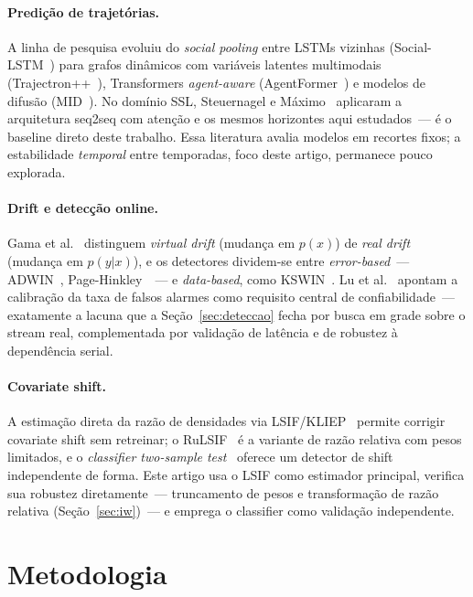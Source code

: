 \documentclass[runningheads]{llncs}
\begin{document}
\paragraph{Predi\c{c}\~ao de trajet\'orias.}
A linha de pesquisa evoluiu do \textit{social pooling} entre LSTMs vizinhas (Social-LSTM~\cite{alahi2016}) para grafos din\^amicos com vari\'aveis latentes multimodais (Trajectron++~\cite{salzmann2020}), Transformers \textit{agent-aware} (AgentFormer~\cite{yuan2021}) e modelos de difus\~ao (MID~\cite{gu2022}). No dom\'inio SSL, Steuernagel e M\'aximo~\cite{seq2seq} aplicaram a arquitetura seq2seq com aten\c{c}\~ao e os mesmos horizontes aqui estudados~--- \'e o baseline direto deste trabalho. Essa literatura avalia modelos em recortes fixos; a estabilidade \emph{temporal} entre temporadas, foco deste artigo, permanece pouco explorada.

\paragraph{Drift e detec\c{c}\~ao online.}
Gama et al.~\cite{gama2014} distinguem \textit{virtual drift} (mudan\c{c}a em $p(x)$) de \textit{real drift} (mudan\c{c}a em $p(y|x)$), e os detectores dividem-se entre \textit{error-based}~--- ADWIN~\cite{adwin}, Page-Hinkley~\cite{page_hinkley}~--- e \textit{data-based}, como KSWIN~\cite{kswin}. Lu et al.~\cite{lu2019} apontam a calibra\c{c}\~ao da taxa de falsos alarmes como requisito central de confiabilidade~--- exatamente a lacuna que a Se\c{c}\~ao~\ref{sec:deteccao} fecha por busca em grade sobre o stream real, complementada por valida\c{c}\~ao de lat\^encia e de robustez \`a depend\^encia serial.

\paragraph{Covariate shift.}
A estima\c{c}\~ao direta da raz\~ao de densidades via LSIF/KLIEP~\cite{kliep,kanamori2009,sugiyama_book} permite corrigir covariate shift sem retreinar; o RuLSIF~\cite{yamada2013} \'e a variante de raz\~ao relativa com pesos limitados, e o \textit{classifier two-sample test}~\cite{lopezpaz2017} oferece um detector de shift independente de forma. Este artigo usa o LSIF como estimador principal, verifica sua robustez diretamente~--- truncamento de pesos e transforma\c{c}\~ao de raz\~ao relativa (Se\c{c}\~ao~\ref{sec:iw})~--- e emprega o classifier como valida\c{c}\~ao independente.

\section{Metodologia}
\label{sec:metodologia}
\end{document}

